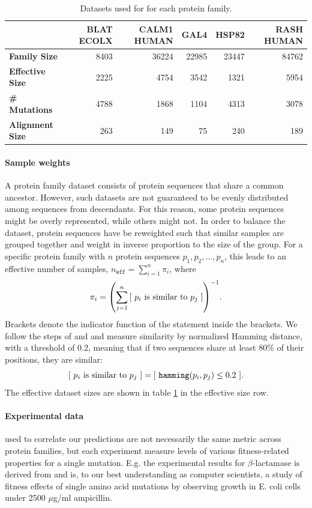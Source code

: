 \begin{table}[ht]
    \centering
    \begin{tabularx}{\textwidth}{l rrrrr}
    \hline
    & \textbf{BLAT ECOLX} & \textbf{CALM1 HUMAN} & \textbf{GAL4} & \textbf{HSP82} & \textbf{RASH HUMAN} \\ \hline
    \textbf{Family Size}    & 8403 & 36224 & 22985 & 23447 & 84762 \\
    \textbf{Effective Size} & 2225 &  4754 &  3542 &  1321 &  5954 \\
    \textbf{\# Mutations}   & 4788 &  1868 &  1104 &  4313 &  3078 \\
    \textbf{Alignment Size} &  263 &   149 &    75 &   240 &   189 \\
    \hline
    \end{tabularx}
    \caption{Datasets used for for each protein family.}
    \label{tab:datasets}
\end{table}

\paragraph{Sample weights} A protein family dataset consists of protein sequences that share a common ancestor. However, such datasets are not guaranteed to be evenly distributed among sequences from descendants. For this reason, some protein sequences might be overly represented, while others might not. In order to balance the dataset, protein sequences have be reweighted such that similar samples are grouped together and weight in inverse proportion to the size of the group. For a specific protein family with $n$ protein sequences $p_1, p_2, \ldots, p_n$, this leads to an effective number of samples, $n_{\texttt{eff}} = \sum_{i = 1}^n \pi_i$, where
    \[ \pi_i ={\mathopen{} \left( \sum_{j = 1}^n {\mathopen{} \left[  \text{ $p_i$ is similar to $p_j$ }  \right] \mathclose{}} \right) \mathclose{}}^{-1}. \]
Brackets denote the indicator function of the statement inside the brackets. We follow the steps of \cite{riesselman2018deep} and \cite{hopf2017mutation} and measure similarity by normalized Hamming distance, with a threshold of 0.2, meaning that if two sequences share at least 80\% of their positions, they are similar:
  \[ {\mathopen{} \left[  \text{ $p_i$ is similar to $p_j$ }  \right] \mathclose{}} = {\mathopen{} \left[  \ \texttt{hamming}{\mathopen{} \left( p_i, p_j \right) \mathclose{}} \leq 0.2 \  \right] \mathclose{}}.\]
The effective dataset sizes are shown in table \ref{tab:datasets} in the effective size row.
\paragraph{Experimental data} used to correlate our predictions are not necessarily the same metric across protein families, but each experiment measure levels of various fitness-related properties for a single mutation. E.g. the experimental results for $\beta$-lactamase is derived from \cite{stiffler2015evolvability} and is, to our best understanding as computer scientists, a study of fitness effects of single  amino acid mutations by observing growth in E. coli cells under 2500 $\mu$g/ml ampicillin. 


